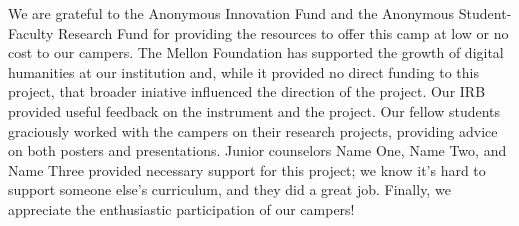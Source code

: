 \begin{acks}
We are grateful to the Anonymous Innovation Fund and the Anonymous
Student-Faculty Research Fund for providing the resources to offer
this camp at low or no cost to our campers.  The Mellon Foundation
has supported the growth of digital humanities at our institution
and, while it provided no direct funding to this project, that
broader iniative influenced the direction of the project.  Our IRB
provided useful feedback on the instrument and the project.  Our
fellow students graciously worked with the campers on their research
projects, providing advice on both posters and presentations.  Junior
counselors Name One, Name Two, and Name Three provided necessary
support for this project; we know it's hard to support someone
else's curriculum, and they did a great job.  Finally, we appreciate
the enthusiastic participation of our campers!
\end{acks}
